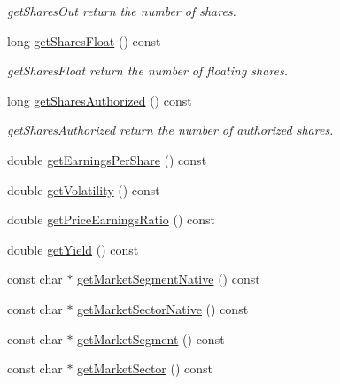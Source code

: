 \begin{CompactItemize}
\begin{CompactList}\small\item\em get\-Shares\-Out return the number of shares. \item\end{CompactList}\item 
long \hyperlink{classWombat_1_1MamdaFundamentalListener_4a4693aa809d7affdaeda70f34f002d7}{get\-Shares\-Float} () const 
\begin{CompactList}\small\item\em get\-Shares\-Float return the number of floating shares. \item\end{CompactList}\item 
long \hyperlink{classWombat_1_1MamdaFundamentalListener_271ea50e95b80126e461612c0ab7ed09}{get\-Shares\-Authorized} () const 
\begin{CompactList}\small\item\em get\-Shares\-Authorized return the number of authorized shares. \item\end{CompactList}\item 
double \hyperlink{classWombat_1_1MamdaFundamentalListener_e4219dceb76af963348acab9b9a27246}{get\-Earnings\-Per\-Share} () const 
\item 
double \hyperlink{classWombat_1_1MamdaFundamentalListener_641fd03980bd391579bb99ac1393594e}{get\-Volatility} () const 
\item 
double \hyperlink{classWombat_1_1MamdaFundamentalListener_c075de507dd9561ed9af165d56674410}{get\-Price\-Earnings\-Ratio} () const 
\item 
double \hyperlink{classWombat_1_1MamdaFundamentalListener_89cfb3cdee2c8597e1684e71c69fc50a}{get\-Yield} () const 
\item 
const char $\ast$ \hyperlink{classWombat_1_1MamdaFundamentalListener_579d342071f318ca31a7fc55e11f9ea3}{get\-Market\-Segment\-Native} () const 
\item 
const char $\ast$ \hyperlink{classWombat_1_1MamdaFundamentalListener_5451ffdbcd4d4833e7fce5e19d2a3282}{get\-Market\-Sector\-Native} () const 
\item 
const char $\ast$ \hyperlink{classWombat_1_1MamdaFundamentalListener_7f2643689fe51a96a052eebcc6d50e9a}{get\-Market\-Segment} () const 
\item 
const char $\ast$ \hyperlink{classWombat_1_1MamdaFundamentalListener_11041dcd12c8969eebdd41e6f96afed8}{get\-Market\-Sector} () const 
\item 

\end{CompactItemize}
